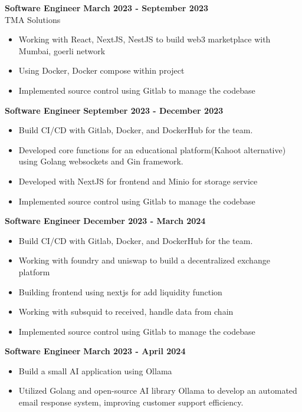 \documentclass{article}
\newenvironment{bullets}{
    \begin{itemize}
    \setlength{\itemsep}{0pt}
    \setlength{\parskip}{0pt}
    \setlength{\parsep}{0pt}
}{
    \end{itemize}
}
\begin{document}
\textbf{Software Engineer} \hfill \textbf{March 2023 - September 2023}\\
TMA Solutions

\begin{bullets}
    \item Working with React, NextJS, NestJS to build web3 marketplace with Mumbai, goerli network
    \item Using Docker, Docker compose within project
    \item Implemented source control using Gitlab to manage the codebase
\end{bullets}

\textbf{Software Engineer} \hfill \textbf{September 2023 - December 2023}\\
\begin{bullets}
    \item Build CI/CD with Gitlab, Docker, and DockerHub for the team.
    \item Developed core functions for an educational platform(Kahoot alternative) using Golang websockets and Gin framework.
    \item Developed with NextJS for frontend and Minio for storage service
    \item Implemented source control using Gitlab to manage the codebase
\end{bullets}

\textbf{Software Engineer} \hfill 
\textbf{December 2023 - March 2024}\\
\begin{bullets}
    \item Build CI/CD with Gitlab, Docker, and DockerHub for the team.
    \item Working with foundry and uniswap to build a decentralized exchange platform
    \item Building frontend using nextjs for add liquidity function
    \item Working with subsquid to received, handle data from chain 
    \item Implemented source control using Gitlab to manage the codebase
\end{bullets}

\textbf{Software Engineer} \hfill 
\textbf{March 2023 - April 2024}\\
\begin{bullets}
    \item Build a small AI application using Ollama
    \item Utilized Golang and open-source AI library Ollama to develop an automated email response system, improving customer support efficiency.
\end{bullets}
\end{document}
